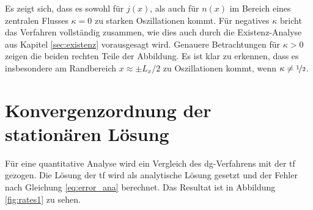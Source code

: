 Es zeigt sich, dass es sowohl für $j(x)$, als auch für $n(x)$ im Bereich eines zentralen Flusses $\kappa=0$ zu starken Oszillationen kommt. Für negatives $\kappa$ bricht das Verfahren vollständig zusammen, wie dies auch durch die Existenz-Analyse aus Kapitel \ref{sec:existenz} vorausgesagt wird. Genauere Betrachtungen für $\kappa>0$ zeigen die beiden rechten Teile der Abbildung. Es ist klar zu erkennen, dass es insbesondere am Randbereich $x\approx \pm L_x/2$ zu Oszillationen kommt, wenn $\kappa\neq \nicefrac{1}{2}$.



\section{Konvergenzordnung der stationären Lösung}\label{sec:rates}
Für eine quantitative Analyse wird ein Vergleich des \ac{dg}-Verfahrens mit der \ac{tf} gezogen. Die Lösung der \ac{tf} wird als analytische Lösung gesetzt und der Fehler nach Gleichung \eqref{eq:error_ana} berechnet. Das Resultat ist in Abbildung \ref{fig:rates1} zu sehen.
